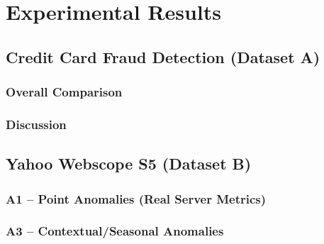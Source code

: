 \chapter{Experimental Results}
\label{ch:results}


\section{Credit Card Fraud Detection (Dataset A)}

\subsection{Overall Comparison}

\subsection{Discussion}

\section{Yahoo Webscope S5 (Dataset B)}

\subsection{A1 -- Point Anomalies (Real Server Metrics)}
\subsection{A3 -- Contextual/Seasonal Anomalies}
